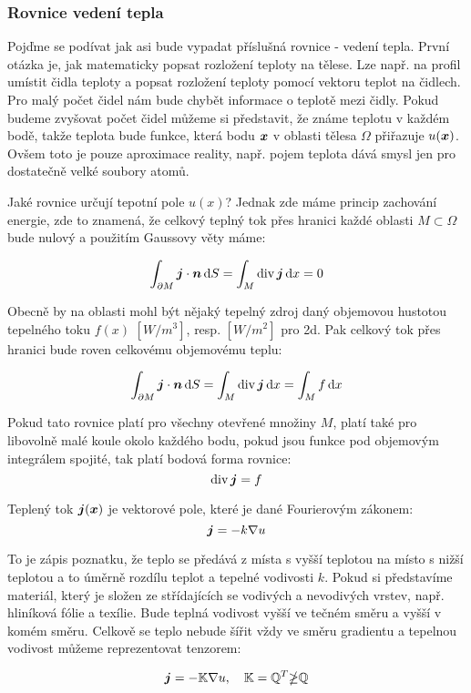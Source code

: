 \subsubsection{Rovnice vedení tepla}
Pojďme se podívat jak asi bude vypadat příslušná rovnice - vedení tepla. 
První otázka je, jak matematicky popsat rozložení teploty na tělese. Lze např. 
na profil umístit čidla teploty a popsat rozložení teploty pomocí vektoru teplot 
na čidlech. Pro malý počet čidel nám bude chybět informace o teplotě mezi čidly. 
Pokud budeme zvyšovat počet čidel můžeme si představit, že známe teplotu v každém 
bodě, takže teplota bude funkce, která bodu $\mathbf{\boldsymbol{x}}$ v oblasti tělesa $\Omega$ přiřazuje 
$u(\mathbf{\boldsymbol{x}})$. Ovšem toto je pouze aproximace reality, např. pojem teplota dává smysl jen 
pro dostatečně velké soubory atomů.

Jaké rovnice určují tepotní pole $u(x)$? Jednak zde máme princip zachování energie,
zde to znamená, že celkový teplný tok přes hranici každé oblasti $M \subset \Omega$
bude nulový a použitím Gaussovy věty máme:

\[
    \int_{\partial M} \mathbf{\boldsymbol{j}} \cdot \mathbf{\boldsymbol{n}} \,{\rm d} S = \int_{M} \operatorname{div} \mathbf{\boldsymbol{j}} \,{\rm d} x = 0
\]

Obecně by na oblasti mohl být nějaký tepelný zdroj daný objemovou hustotou
tepelného toku $f(x)$ $[W/m^3]$, resp. $[W/m^2]$ pro 2d. Pak celkový tok přes hranici 
bude roven celkovému objemovému teplu:

\[
    \int_{\partial M} \mathbf{\boldsymbol{j}} \cdot \mathbf{\boldsymbol{n}} \,{\rm d} S = \int_{M} \operatorname{div} \mathbf{\boldsymbol{j}} \,{\rm d} x = \int_{M} f \,{\rm d} x
\]

Pokud tato rovnice platí pro všechny otevřené množiny $M$, platí také pro libovolně malé koule 
okolo každého bodu, pokud jsou funkce pod objemovým integrálem spojité, tak platí bodová 
forma rovnice:
\[
    \operatorname{div} \mathbf{\boldsymbol{j}} = f
\]


Teplený tok $\mathbf{\boldsymbol{j}}(\mathbf{\boldsymbol{x}})$ je vektorové pole, které je dané Fourierovým zákonem:
\[
   \mathbf{\boldsymbol{j}} = - k \nabla u 
\]

To je zápis poznatku, že teplo se předává z místa s vyšší teplotou na místo s nižší 
teplotou a to úměrně rozdílu teplot a tepelné vodivosti $k$. Pokud si představíme 
materiál, který je složen ze střídajících se vodivých a nevodivých vrstev, 
např. hliníková fólie a texílie. Bude teplná vodivost vyšší ve tečném směru a 
vyšší v komém směru. Celkově se teplo nebude šířit vždy ve směru 
gradientu a tepelnou vodivost můžeme reprezentovat tenzorem:

\[
   \mathbf{\boldsymbol{j}} = -{\mathbb{K}} \nabla u,\quad {\mathbb{K}} = {\mathbb{Q}}^T {\mathbb{ \Lambda}} {\mathbb{Q}}
\]

